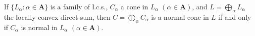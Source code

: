 If $\{L_\alpha : \alpha \in \mathbf{A}\}$ is a family of l.c.s., $C_\alpha$ a cone in $L_\alpha$ $(\alpha \in \mathbf{A})$, and $L = \bigoplus_\alpha L_\alpha$ the locally convex direct sum, then $C = \bigoplus_\alpha C_\alpha$ is a normal cone in $L$ if and only if $C_\alpha$ is normal in $L_\alpha$ $(\alpha \in \mathbf{A})$.
